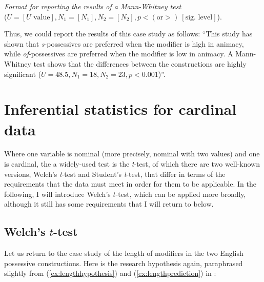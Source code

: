 \begin{exe}
\ex \textit{Format for reporting the results of a Mann\hyp{}Whitney test} \\
($U = [U\text{ value}], N_1 = [N_1], N_2 = [N_2], p < (\text{or} >)~[\text{sig. level}]$).
\label{ex:reportingmannwhitney}
\end{exe}

Thus, we could report the results of this case study as follows: ``This study has shown that \textit{s}-possessives are preferred when the modifier is high in animacy,  while \textit{of}-possessives  are preferred when the modifier is low in animacy. A Mann\hyp{}Whitney  test shows that the differences between the constructions are highly significant  ($U = 48.5, N_1 = 18, N_2 = 23, p < 0.001$)''.

\section{Inferential statistics for cardinal data}
\label{sec:statisticscardinal}

Where one variable is nominal  (more precisely, nominal with two values) and one is cardinal,  the a widely\hyp{}used test is the \textit{t}-test,  of which there are two well\hyp{}known versions, Welch's \textit{t}-test and Student's \textit{t}-test, that differ in terms of the requirements that the data must meet in order for them to be applicable. In the following, I will introduce Welch's $t$\hyp{}test, which can be applied more broadly, although it still has some requirements that I will return to below.

\subsection{Welch's $t$\hyp{}test}
\label{sec:welchsttest}


Let us return to the case study of the length  of modifiers in the two English possessive constructions. Here is the research hypothesis again, paraphrased slightly from (\ref{ex:lengthhypothesis}) and (\ref{ex:lengthprediction}) in :

